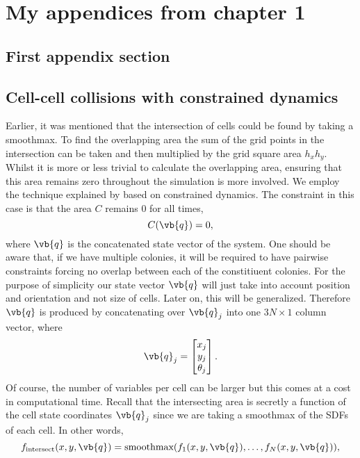 \chapter{My appendices from chapter 1 \label{app:chapter_1}}

\section{First appendix section}
\section{Cell-cell collisions with constrained dynamics}
Earlier, it was mentioned that the intersection of cells could be found by taking a smoothmax. To find the overlapping area
the sum of the grid points in the intersection can be taken and then multiplied by the grid square area $h_x h_y$. Whilst
it is more or less trivial to calculate the overlapping area, ensuring that this area remains zero throughout the simulation
is more involved. We employ the technique explained by \cite{witkin1997introduction} based on constrained
dynamics. The constraint in this case is that the area $C$ remains $0$ for all times,
\begin{equation}
    C(\vb{q}) = 0,
\end{equation}
where $\vb{q}$ is the concatenated state vector of the system. One should be aware that, if we have multiple colonies, it will
be required to have pairwise constraints forcing no overlap between each of the constitiuent colonies. For the purpose of simplicity
our state vector $\vb{q}$ will just take into account position and orientation and not size of cells. Later on, this will be generalized.
Therefore $\vb{q}$ is produced by concatenating over $\vb{q}_j$ into one $3N \times 1$ column vector, where
\begin{equation}
\vb{q}_j = \begin{bmatrix}
                x_j \\
                y_j \\
                \theta_j
            \end{bmatrix}.
\end{equation}
Of course, the number of variables per cell can be larger but this comes at a cost in computational time. Recall that the 
intersecting area is secretly a function of the cell state coordinates $\vb{q}_j$ since we are taking a smoothmax of the SDFs 
of each cell. In other words,
\begin{equation*}
f_{\textrm{intersect}}(x,y,\vb{q}) = \textrm{smoothmax}(f_1(x,y,\vb{q}) , \ldots, f_N(x,y,\vb{q}) ),
\end{equation*}

